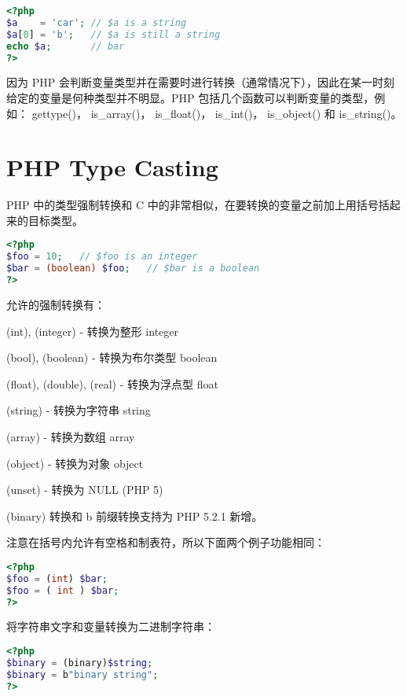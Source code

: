 \begin{lstlisting}[language=PHP]
<?php
$a    = 'car'; // $a is a string
$a[0] = 'b';   // $a is still a string
echo $a;       // bar
?>
\end{lstlisting}

因为 PHP 会判断变量类型并在需要时进行转换（通常情况下），因此在某一时刻给定的变量是何种类型并不明显。PHP 包括几个函数可以判断变量的类型，例如： gettype()， is\_array()， is\_float()， is\_int()， is\_object() 和 is\_string()。

\section{PHP Type Casting}

PHP 中的类型强制转换和 C 中的非常相似，在要转换的变量之前加上用括号括起来的目标类型。


\begin{lstlisting}[language=PHP]
<?php
$foo = 10;   // $foo is an integer
$bar = (boolean) $foo;   // $bar is a boolean
?>
\end{lstlisting}


允许的强制转换有：

\begin{compactitem}
\item (int), (integer) - 转换为整形 integer
\item (bool), (boolean) - 转换为布尔类型 boolean
\item (float), (double), (real) - 转换为浮点型 float
\item (string) - 转换为字符串 string
\item (array) - 转换为数组 array
\item (object) - 转换为对象 object
\item (unset) - 转换为 NULL (PHP 5)
\end{compactitem}

(binary) 转换和 b 前缀转换支持为 PHP 5.2.1 新增。

注意在括号内允许有空格和制表符，所以下面两个例子功能相同：



\begin{lstlisting}[language=PHP]
<?php
$foo = (int) $bar;
$foo = ( int ) $bar;
?>
\end{lstlisting}

将字符串文字和变量转换为二进制字符串：


\begin{lstlisting}[language=PHP]
<?php
$binary = (binary)$string;
$binary = b"binary string";
?>
\end{lstlisting}

